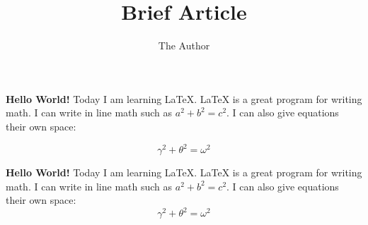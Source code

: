 \documentclass[11pt, oneside]{article}   	%
\title{Brief Article}
\author{The Author}
\begin{document}
\maketitle

\textbf{Hello World!} Today I am learning \LaTeX. \LaTeX{} is a great program for writing math. I can write in line math such as \begin{math} a^2 + b^2 = c^2 \end{math}. I can also give equations their own space:

\begin{equation}
    \gamma ^ 2 + \theta^2=\omega ^2
\end{equation}


\textbf{Hello World!} Today I am learning \LaTeX. \LaTeX{} is a great program for writing math. I can write in line math such as $a^2 + b^2 = c^2$. I can also give equations their own space:
\[\gamma ^ 2 + \theta^2=\omega ^2\]
\end{document}
